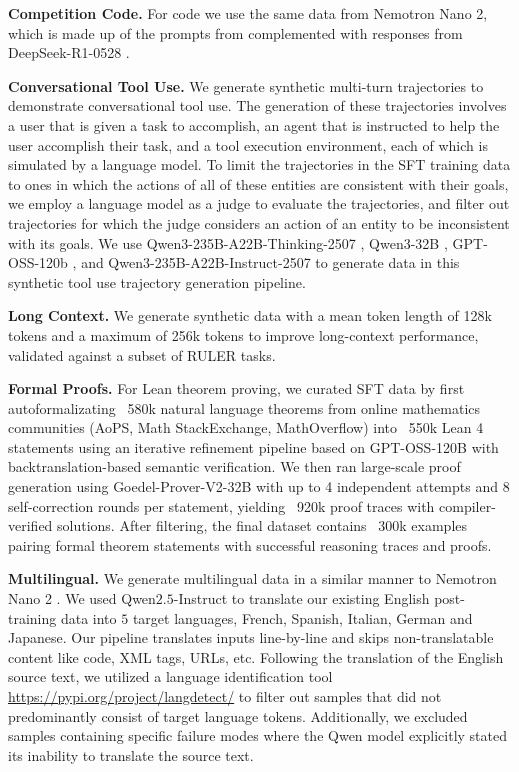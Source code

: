 \textbf{Competition Code.} For code we use the same data from Nemotron Nano 2, which is made up of the prompts from \citet{ahmad2025opencodereasoning} complemented with responses from DeepSeek-R1-0528 \citep{deepseekai2025deepseekr1incentivizingreasoningcapability}.


\textbf{Conversational Tool Use.} We generate synthetic multi-turn trajectories to demonstrate conversational tool use. The generation of these trajectories involves a user that is given a task to accomplish, an agent that is instructed to help the user accomplish their task, and a tool execution environment, each of which is simulated by a language model. To limit the trajectories in the SFT training data to ones in which the actions of all of these entities are consistent with their goals, we employ a language model as a judge to evaluate the trajectories, and filter out trajectories for which the judge considers an action of an entity to be inconsistent with its goals. We use Qwen3-235B-A22B-Thinking-2507 \citep{yang2025qwen3technicalreport}, Qwen3-32B \citep{yang2025qwen3technicalreport}, GPT-OSS-120b \citep{openai2025gptoss120bgptoss20bmodel}, and Qwen3-235B-A22B-Instruct-2507 \citep{yang2025qwen3technicalreport} to generate data in this synthetic tool use trajectory generation pipeline.

\textbf{Long Context.} We generate synthetic data with a mean token length of 128k tokens and a maximum of 256k tokens to improve long-context performance, validated against a subset of RULER tasks.

\textbf{Formal Proofs.} For Lean theorem proving, we curated SFT data by first autoformalizating ~580k natural language theorems from online mathematics communities (AoPS, Math StackExchange, MathOverflow) into ~550k Lean 4 statements using an iterative refinement pipeline based on GPT-OSS-120B with backtranslation-based semantic verification. We then ran large-scale proof generation using Goedel-Prover-V2-32B with up to 4 independent attempts and 8 self-correction rounds per statement, yielding ~920k proof traces with compiler-verified solutions. After filtering, the final dataset contains ~300k examples pairing formal theorem statements with successful reasoning traces and proofs.

\textbf{Multilingual.} We generate multilingual data in a similar manner to Nemotron Nano 2 \citep{nemotronnanov2}. We used Qwen$2.5$-Instruct to translate our existing English post-training data into $5$ target languages, French, Spanish, Italian, German and Japanese. Our pipeline translates inputs line-by-line and skips non-translatable content like code, XML tags, URLs, etc. 
Following the translation of the English source text, we utilized a language identification tool \url{https://pypi.org/project/langdetect/} to filter out samples that did not predominantly consist of target language tokens. Additionally, we excluded samples containing specific failure modes where the Qwen model explicitly stated its inability to translate the source text.

